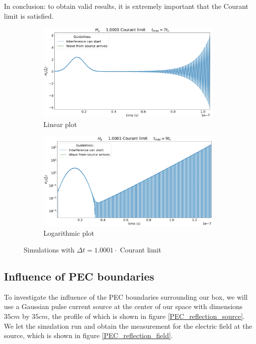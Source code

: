 \documentclass[11pt, a4paper]{article}
\begin{document}
In conclusion: to obtain valid results, it is extremely important that the Courant limit is satisfied.

\begin{figure}[H]
    \centering
    \begin{subfigure}{\textwidth}
        \includegraphics[width=0.95\linewidth]{fig/courant_lin.png}
        \caption{Linear plot}
        \label{fig:courant_lin}
    \end{subfigure}
    \begin{subfigure}{\textwidth}
        \includegraphics[width=0.95\linewidth]{fig/courant_log.png}
        \caption{Logarithmic plot}
        \label{fig:courant_log}
    \end{subfigure}
    \caption{Simulations with $\Delta t = 1.0001 \cdot$ Courant limit}
\end{figure}

\subsection{Influence of PEC boundaries} %

To investigate the influence of the PEC boundaries surrounding our box, we will use a Gaussian pulse current source at the center of our space with dimensions $35 cm$ by $35 cm$, the profile of which is shown in figure \ref{PEC_reflection_source}. We let the simulation run and obtain the measurement for the electric field at the source, which is shown in figure \ref{PEC_reflection_field}.
\end{document}
